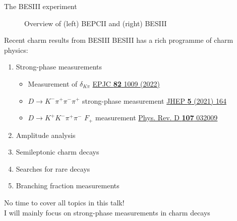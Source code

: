 \documentclass{beamer}
\begin{document}
\begin{frame}{The BESIII experiment}
\begin{figure}
\begin{subfigure}{0.5\textwidth}
    \end{subfigure}
    \caption*{Overview of (left) BEPCII and (right) BESIII}
  \end{figure}
\end{frame}

\begin{frame}{Recent charm results from BESIII}
  \vspace{0.0cm}
  {\large BESIII has a rich programme of charm physics:}
  \begin{enumerate}
    \item{Strong-phase measurements}
    \begin{itemize}
      \item{Measurement of $\delta_{K\pi}$ \href{https://link.springer.com/article/10.1140/epjc/s10052-022-10872-2}{EPJC \textbf{82} 1009 (2022)}}
      \item{$D\to K^-\pi^+\pi^-\pi^+$ strong-phase measurement \href{https://link.springer.com/article/10.1007/JHEP05(2021)164}{JHEP \textbf{5} (2021) 164}}
      \item{$D\to K^+K^-\pi^+\pi^-$ $F_+$ measurement \href{https://journals.aps.org/prd/abstract/10.1103/PhysRevD.107.032009}{Phys. Rev. D \textbf{107} 032009}}
    \end{itemize}
    \item{Amplitude analysis}
    \item{Semileptonic charm decays}
    \item{Searches for rare decays}
    \item{Branching fraction measurements}
  \end{enumerate}
  \begin{center}
    {\Large No time to cover all topics in this talk!\\
      I will mainly focus on strong-phase measurements in charm decays}
  \end{center}
\end{frame}
\end{document}
